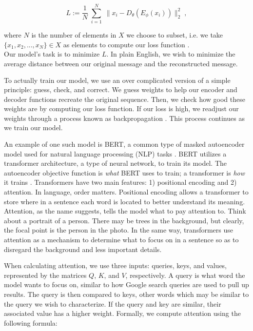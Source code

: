 \documentclass{SBCbookchapter}
\begin{document}
\begin{equation*}
    L := \frac{1}{N} \; \sum_{i = 1}^{N} \; \|x_i -D_\theta(E_\phi(x_i))\|_{2}^{2} \;,
\end{equation*}

\noindent where $N$ is the number of elements in $X$ we choose to subset, i.e. we take \\ $\{x_1, x_2, ..., x_N\} \in X$ as elements to compute our loss function \cite{noauthor_autoencoder_2023}. \\ Our 
model's task is to minimize $L$. In plain English, we wish to minimize the average distance between our original message and the reconstructed message. 

To actually train our model, we use an over complicated version of a simple principle: guess, check, and correct. We guess weights to help our encoder and decoder functions recreate the original 
sequence. Then, we check how good these weights are by computing our loss function. If our loss is high, we readjust our weights through a process known as backpropagation 
\cite{noauthor_multilayer_2023}. This process continues as we train our model.

An example of one such model is BERT, a common type of masked autoencoder model used for natural language processing (NLP) tasks \cite{he_masked_2022}. BERT utilizes a transformer architecture, a type 
of neural network, to train its model. The autoencoder objective function is \textit{what} BERT uses to train; a transformer is \textit{how} it trains \cite{devlin_bert_2018}. Transformers have two main 
features: 1) positional encoding and 2) attention. In language, order matters. Positional encoding allows a transformer to store where in a sentence each word is located to better understand its 
meaning. Attention, as the name suggests, tells the model what to pay attention to. Think about a portrait of a person. There may be trees in the background, but clearly, the focal point is the person 
in the photo. In the same way, transformers use attention as a mechanism to determine what to focus on in a sentence so as to disregard the background and less important details. 

When calculating attention, we use three inputs: queries, keys, and values, represented by the matrices $Q$, $K$, and $V$, respectively. A query is what word the model wants to focus on, similar to how 
Google search queries are used to pull up results. The query is then compared to keys, other words which may be similar to the query we wish to characterize. If the query and key are similar, their 
associated value has a higher weight. Formally, we compute attention using the following formula:
\end{document}
